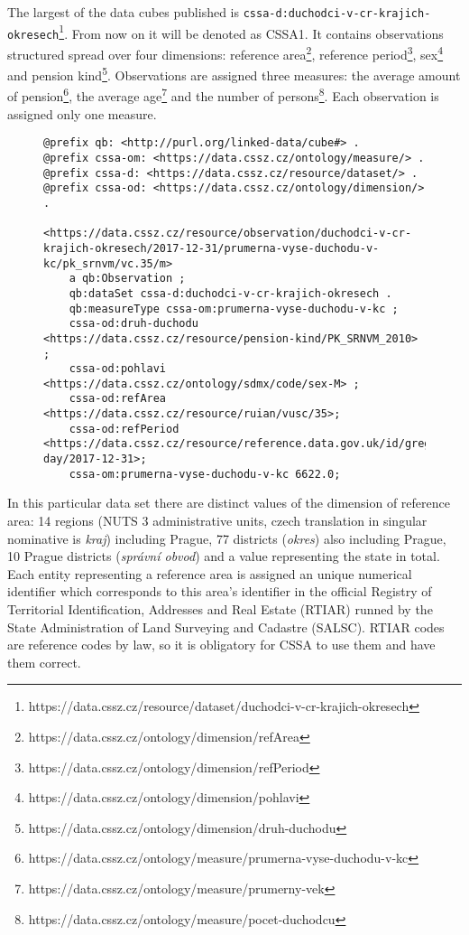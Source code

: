
The largest of the data cubes published is \verb|cssa-d:duchodci-v-cr-krajich-okresech|\footnote{https://data.cssz.cz/resource/dataset/duchodci-v-cr-krajich-okresech}. From now on it will be denoted as CSSA1. It contains  observations structured spread over four dimensions: reference area\footnote{https://data.cssz.cz/ontology/dimension/refArea}, reference period\footnote{https://data.cssz.cz/ontology/dimension/refPeriod}, sex\footnote{https://data.cssz.cz/ontology/dimension/pohlavi} and pension kind\footnote{https://data.cssz.cz/ontology/dimension/druh-duchodu}. Observations are assigned three measures: the average amount of pension\footnote{https://data.cssz.cz/ontology/measure/prumerna-vyse-duchodu-v-kc}, the average age\footnote{https://data.cssz.cz/ontology/measure/prumerny-vek} and the number of persons\footnote{https://data.cssz.cz/ontology/measure/pocet-duchodcu}. Each observation is assigned only one measure.

\begin{figure}[h]
\begin{lstlisting}[language = turtle, caption={Example of an observation from CSSA1}, label={cssa1example},captionpos=b escapeinside={(*@}{@*)}]
@prefix qb: <http://purl.org/linked-data/cube#> .
@prefix cssa-om: <https://data.cssz.cz/ontology/measure/> .
@prefix cssa-d: <https://data.cssz.cz/resource/dataset/> .
@prefix cssa-od: <https://data.cssz.cz/ontology/dimension/> .

<https://data.cssz.cz/resource/observation/duchodci-v-cr-krajich-okresech/2017-12-31/prumerna-vyse-duchodu-v-kc/pk_srnvm/vc.35/m>
    a qb:Observation ;
    qb:dataSet cssa-d:duchodci-v-cr-krajich-okresech .
    qb:measureType cssa-om:prumerna-vyse-duchodu-v-kc ;
    cssa-od:druh-duchodu <https://data.cssz.cz/resource/pension-kind/PK_SRNVM_2010> ;
    cssa-od:pohlavi <https://data.cssz.cz/ontology/sdmx/code/sex-M> ;
    cssa-od:refArea <https://data.cssz.cz/resource/ruian/vusc/35>;
    cssa-od:refPeriod <https://data.cssz.cz/resource/reference.data.gov.uk/id/gregorian-day/2017-12-31>;
    cssa-om:prumerna-vyse-duchodu-v-kc 6622.0;
\end{lstlisting}
\end{figure}

In this particular data set there are  distinct values of the dimension of reference area: 14 regions (NUTS 3 administrative units, czech translation in singular nominative is \textit{kraj}) including Prague, 77 districts (\textit{okres}) also including Prague, 10 Prague districts (\textit{správní obvod}) and a value representing the state in total. Each entity representing a reference area is assigned an unique numerical identifier which corresponds to this area's identifier in the official Registry of Territorial Identification, Addresses and Real Estate (RTIAR) runned by the State Administration of Land Surveying and Cadastre (SALSC). RTIAR codes are reference codes by law, so it is obligatory for CSSA to use them and have them correct.

